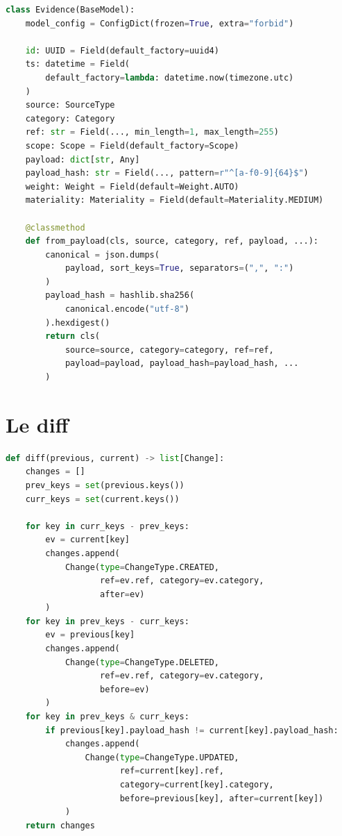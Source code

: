 \begin{lstlisting}[language=Python,caption={Modèle Pydantic
\texttt{Evidence} (extrait).}]
class Evidence(BaseModel):
    model_config = ConfigDict(frozen=True, extra="forbid")

    id: UUID = Field(default_factory=uuid4)
    ts: datetime = Field(
        default_factory=lambda: datetime.now(timezone.utc)
    )
    source: SourceType
    category: Category
    ref: str = Field(..., min_length=1, max_length=255)
    scope: Scope = Field(default_factory=Scope)
    payload: dict[str, Any]
    payload_hash: str = Field(..., pattern=r"^[a-f0-9]{64}$")
    weight: Weight = Field(default=Weight.AUTO)
    materiality: Materiality = Field(default=Materiality.MEDIUM)

    @classmethod
    def from_payload(cls, source, category, ref, payload, ...):
        canonical = json.dumps(
            payload, sort_keys=True, separators=(",", ":")
        )
        payload_hash = hashlib.sha256(
            canonical.encode("utf-8")
        ).hexdigest()
        return cls(
            source=source, category=category, ref=ref,
            payload=payload, payload_hash=payload_hash, ...
        )
\end{lstlisting}

\section{Le diff}

\begin{lstlisting}[language=Python,caption={Moteur de diff (extrait).}]
def diff(previous, current) -> list[Change]:
    changes = []
    prev_keys = set(previous.keys())
    curr_keys = set(current.keys())

    for key in curr_keys - prev_keys:
        ev = current[key]
        changes.append(
            Change(type=ChangeType.CREATED,
                   ref=ev.ref, category=ev.category,
                   after=ev)
        )
    for key in prev_keys - curr_keys:
        ev = previous[key]
        changes.append(
            Change(type=ChangeType.DELETED,
                   ref=ev.ref, category=ev.category,
                   before=ev)
        )
    for key in prev_keys & curr_keys:
        if previous[key].payload_hash != current[key].payload_hash:
            changes.append(
                Change(type=ChangeType.UPDATED,
                       ref=current[key].ref,
                       category=current[key].category,
                       before=previous[key], after=current[key])
            )
    return changes
\end{lstlisting}

